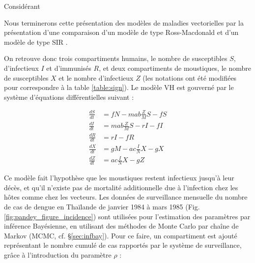 

 
Considérant 


Nous terminerons cette présentation des modèles de maladies vectorielles par la présentation d'une comparaison d'un modèle de type Ross-Macdonald et d'un modèle de type SIR \cite{pandey2013comparing}. 


On retrouve donc trois compartiments humains, le nombre de susceptibles $S$, d'infectieux $I$ et d'immunisés $R$, et deux compartiments de moustiques, le nombre de susceptibles $X$ et le nombre d'infectieux $Z$ (les notations ont été modifiées pour correspondre à la table \ref{table:sign}). 
Le modèle VH est gouverné par le système d'équations différentielles suivant :

\begin{align}
\frac{dS}{dt} &= fN - mab\frac{Z}{M}S - fS \\ \nonumber
\frac{dI}{dt} &= mab\frac{Z}{M}S - rI - fI \\ \nonumber
\frac{dR}{dt} &= rI - fR \\  \nonumber
\frac{dX}{dt} &= gM - ac\frac{I}{N}X - gX \\ \nonumber
\frac{dZ}{dt} &= ac\frac{I}{N}X - gZ
\end{align}

\noindent Ce modèle fait l'hypothèse que les moustiques restent infectieux jusqu'à leur décès, et qu'il n'existe pas de mortalité additionnelle due à l'infection chez les hôtes comme chez les vecteurs.
Les données de surveillance mensuelle du nombre de cas de dengue en Thaïlande de janvier 1984 à mars 1985 (Fig. \ref{fig:pandey_figure_incidence}) sont utilisées pour l'estimation des paramètres par inférence Bayésienne, en utilisant des méthodes de Monte Carlo par chaîne de Markov (MCMC, cf. \S \ref{sec:infbay}).
Pour ce faire, un compartiment est ajouté représentant le nombre cumulé de cas rapportés par le système de surveillance, grâce à l'introduction du paramètre $\rho$ :

